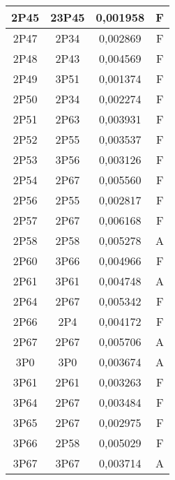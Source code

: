 \begin{center}
\begin{longtable}{|c|c|c|c|}
    \hline	2P45	&	23P45	&	0,001958	&	F	\\
    \hline	2P47	&	2P34	&	0,002869	&	F	\\
    \hline	2P48	&	2P43	&	0,004569	&	F	\\
    \hline	2P49	&	3P51	&	0,001374	&	F	\\
    \hline	2P50	&	2P34	&	0,002274	&	F	\\
    \hline	2P51	&	2P63	&	0,003931	&	F	\\
    \hline	2P52	&	2P55	&	0,003537	&	F	\\
    \hline	2P53	&	3P56	&	0,003126	&	F	\\
    \hline	2P54	&	2P67	&	0,005560	&	F	\\
    \hline	2P56	&	2P55	&	0,002817	&	F	\\
    \hline	2P57	&	2P67	&	0,006168	&	F	\\
    \hline	2P58	&	2P58	&	0,005278	&	A	\\
    \hline	2P60	&	3P66	&	0,004966	&	F	\\
    \hline	2P61	&	3P61	&	0,004748	&	A	\\
    \hline	2P64	&	2P67	&	0,005342	&	F	\\
    \hline	2P66	&	2P4	&	0,004172	&	F	\\
    \hline	2P67	&	2P67	&	0,005706	&	A	\\
    \hline	3P0	&	3P0	&	0,003674	&	A	\\
    \hline	3P61	&	2P61	&	0,003263	&	F	\\
    \hline	3P64	&	2P67	&	0,003484	&	F	\\
    \hline	3P65	&	2P67	&	0,002975	&	F	\\
    \hline	3P66	&	2P58	&	0,005029	&	F	\\
    \hline	3P67	&	3P67	&	0,003714	&	A	\\
	\end{longtable}
\end{center}




